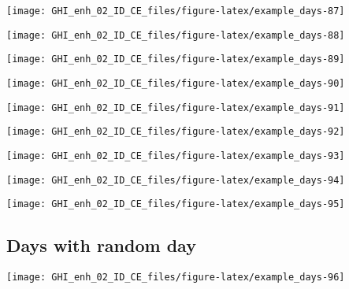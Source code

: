 \documentclass[
  10pt,
  a4paper,oneside]{article}
\begin{document}
\begin{center}\texttt{[image: GHI\_enh\_02\_ID\_CE\_files/figure-latex/example\_days-87]} \end{center}

\begin{center}\texttt{[image: GHI\_enh\_02\_ID\_CE\_files/figure-latex/example\_days-88]} \end{center}

\begin{center}\texttt{[image: GHI\_enh\_02\_ID\_CE\_files/figure-latex/example\_days-89]} \end{center}

\begin{center}\texttt{[image: GHI\_enh\_02\_ID\_CE\_files/figure-latex/example\_days-90]} \end{center}

\begin{center}\texttt{[image: GHI\_enh\_02\_ID\_CE\_files/figure-latex/example\_days-91]} \end{center}

\begin{center}\texttt{[image: GHI\_enh\_02\_ID\_CE\_files/figure-latex/example\_days-92]} \end{center}

\begin{center}\texttt{[image: GHI\_enh\_02\_ID\_CE\_files/figure-latex/example\_days-93]} \end{center}

\begin{center}\texttt{[image: GHI\_enh\_02\_ID\_CE\_files/figure-latex/example\_days-94]} \end{center}

\begin{center}\texttt{[image: GHI\_enh\_02\_ID\_CE\_files/figure-latex/example\_days-95]} \end{center}

\FloatBarrier

\hypertarget{days-with-random-day}{%
\subsection{Days with random day}\label{days-with-random-day}}

\begin{center}\texttt{[image: GHI\_enh\_02\_ID\_CE\_files/figure-latex/example\_days-96]} \end{center}
\end{document}
